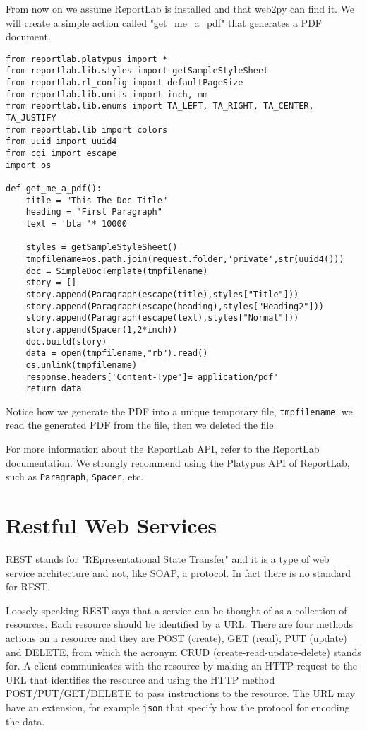 \documentclass[justified,sixbynine,notoc]{tufte-book}
\def\ft{\small\tt}
\def\inxx#1{\index{#1}}
\begin{document}
\begin{fullwidth}
From now on we assume ReportLab is installed and that web2py can find it.
We will create a simple action called "get\_me\_a\_pdf" that generates a PDF document.
\begin{lstlisting}
from reportlab.platypus import *
from reportlab.lib.styles import getSampleStyleSheet
from reportlab.rl_config import defaultPageSize
from reportlab.lib.units import inch, mm
from reportlab.lib.enums import TA_LEFT, TA_RIGHT, TA_CENTER, TA_JUSTIFY
from reportlab.lib import colors
from uuid import uuid4
from cgi import escape
import os

def get_me_a_pdf():
    title = "This The Doc Title"
    heading = "First Paragraph"
    text = 'bla '* 10000

    styles = getSampleStyleSheet()
    tmpfilename=os.path.join(request.folder,'private',str(uuid4()))
    doc = SimpleDocTemplate(tmpfilename)
    story = []
    story.append(Paragraph(escape(title),styles["Title"]))
    story.append(Paragraph(escape(heading),styles["Heading2"]))
    story.append(Paragraph(escape(text),styles["Normal"]))
    story.append(Spacer(1,2*inch))
    doc.build(story)
    data = open(tmpfilename,"rb").read()
    os.unlink(tmpfilename)
    response.headers['Content-Type']='application/pdf'
    return data
\end{lstlisting}

Notice how we generate the PDF into a unique temporary file, {\ft tmpfilename}, we read the generated PDF from the file, then we deleted the file.

For more information about the ReportLab API, refer to the ReportLab documentation. We strongly recommend using the Platypus API of ReportLab, such as {\ft Paragraph}, {\ft Spacer}, etc.

\goodbreak\section{Restful Web Services}

\inxx{REST}

REST stands for "REpresentational State Transfer" and it is a type of web service architecture and not, like SOAP, a protocol. In fact there is no standard for REST.

Loosely speaking REST says that a service can be thought of as a collection of resources. Each resource should be identified by a URL. There are four methods actions on a resource and they are POST (create), GET (read), PUT (update) and DELETE, from which the acronym CRUD (create-read-update-delete) stands for. A client communicates with the resource by making an HTTP request to the URL that identifies the resource and using the HTTP method POST/PUT/GET/DELETE to pass instructions to the resource. The URL may have an extension, for example {\ft json} that specify how the protocol for encoding the data.


\end{fullwidth}
\end{document}
